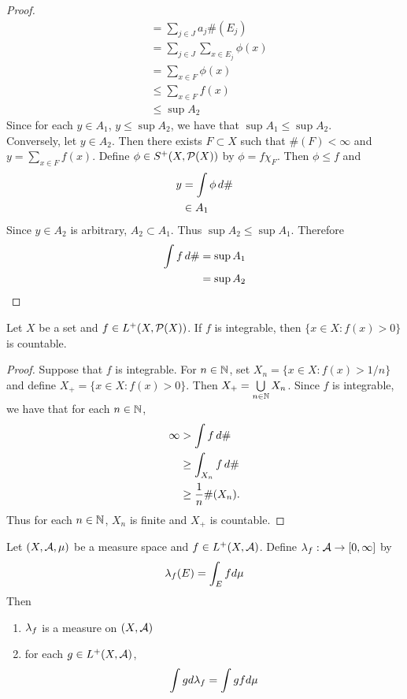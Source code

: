 \documentclass{book}
\begin{document}
\begin{proof}
\begin{align*}
			& = \sum_{j \in J} a_j \#(E_j) \\
			& = \sum_{j \in J} \sum_{x \in E_j} \phi(x) \\
			& = \sum_{x \in F} \phi(x) \\
			& \leq \sum_{x \in F} f(x) \\
			& \leq \sup A_2 
		\end{align*}
		Since for each $y \in A_1$, $y \leq \sup A_2$, we have that $\sup A_1 \leq \sup A_2$. \\
		Conversely, let $y \in A_2$. Then there exists $F \subset X$ such that $\#(F) < \infty$ and $y = \sum\limits_{x \in F} f(x)$.
		Define $\phi \in S^+(X, \mathcal{P}(X))$ by $\phi = f \chi_F$. Then $\phi \leq f$ and 
		\begin{align*}
			y 
			& = \int \phi \, d \# \\
			& \in A_1
		\end{align*}
		Since $y \in A_2$ is arbitrary, $A_2 \subset A_1$. Thus $\sup A_2 \leq \sup A_1$. Therefore
		\begin{align*}
			\int f \, d \# 
			& = \sup A_1 \\
			& = \sup A_2
		\end{align*}
	\end{proof}

	\begin{ex} 
		 	Let $X$ be a set and $f \in L^+(X, \mathcal{P}(X))$. If $f$ is integrable, then $\{x \in X: f(x) > 0\}$ is countable.
	\end{ex}

	\begin{proof} 
		Suppose that $f$ is integrable. For $n \in \mathbb{N}$, set $X_n = \{x \in X: f(x) > 1/n\}$ and define $X_+ = \{x \in X: f(x) > 0\}$. Then $X_+ = \bigcup\limits_{n \in \mathbb{N}}X_n$. Since $f$ is integrable, we have that for each $n \in \mathbb{N}$,
		\begin{align*}
			\infty 
			&> \int f \, d \#\\
			&\geq \int_{X_n} f \, d \# \\
			&\geq \frac{1}{n} \#(X_n).
		\end{align*}
		Thus for each $n \in \mathbb{N}$, $X_n$ is finite and $X_+$ is countable.
	\end{proof}
	
	\begin{ex} 
		Let $(X, \mathcal{A}, \mu)$ be a measure space and $f \in L^+(X, \mathcal{A})$. Define $\lambda_f: \mathcal{A} \rightarrow [0,\infty]$ by 
		$$\lambda_f(E) = \int_E f d\mu$$ 
		Then 
		\begin{enumerate}
			\item $\lambda_f$ is a measure on $(X, \mathcal{A})$ 
			\item for each $g \in L^+(X, \mathcal{A})$, 
			$$\int g d\lambda_f = \int g f d\mu$$
		\end{enumerate}
	\end{ex}
	
\end{document}
